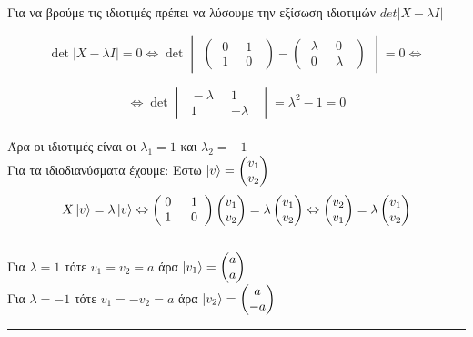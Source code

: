 \documentclass[12pt]{article}
\begin{document}
\section*{{}}
Για να βρούμε τις ιδιοτιμές πρέπει να λύσουμε την εξίσωση ιδιοτιμών $det|X-\lambda I|$

$$ \det |X-\lambda I| = 0 \Leftrightarrow \det \begin{vmatrix}\begin{pmatrix}\;0 \;\; & 1 \;\;\\ \;1 \;\; & 0 \;\;\end{pmatrix} -\begin{pmatrix}\;\lambda \;\; & 0 \;\;\\\;0 \;\; & \lambda \;\;\end{pmatrix}\end{vmatrix}  =0 \Leftrightarrow$$

$$ \Leftrightarrow\det \begin{vmatrix}\;-\lambda \;\; & 1 \;\;\\ \;1 \;\; & -\lambda \;\;\end{vmatrix} = \lambda^2 -1=0 $$ \\
Άρα οι ιδιοτιμές είναι οι $\lambda_1 = 1$ και $\lambda_2=-1$ \\
Για τα ιδιοδιανύσματα έχουμε:
Εστω $\ket{v}=\begin{pmatrix} v_1 \\ v_2\end{pmatrix}$
$$X\ket{v}=\lambda\ket{ v} \Leftrightarrow \begin{pmatrix}\;0 \;\; & 1 \;\;\\ \;1 \;\; & 0 \;\;\end{pmatrix}\begin{pmatrix} v_1 \\ v_2\end{pmatrix}=\lambda\begin{pmatrix} v_1 \\ v_2\end{pmatrix} \Leftrightarrow 
\begin{pmatrix} v_2 \\ v_1\end{pmatrix} = \lambda \begin{pmatrix} v_1 \\ v_2\end{pmatrix}$$\\
Για $\lambda =1 $ τότε $v_1=v_2=a$ άρα $\ket{v_1} = \begin{pmatrix} a \\ a \end{pmatrix}$\\
Για $\lambda =-1 $ τότε $v_1=-v_2=a$ άρα $\ket{v_2} = \begin{pmatrix} a \\ -a \end{pmatrix}$ 
\\\rule{\textwidth}{.5pt}
\end{document}
